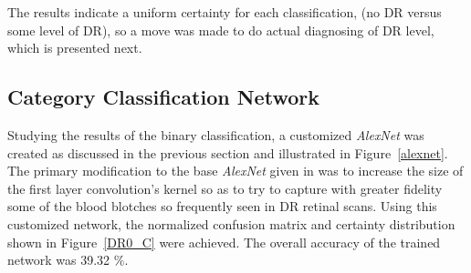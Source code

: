 \documentclass[letterpaper,12pt]{article}
\newcommand{\figref}[1]{Figure~\ref{#1}}
\begin{document}
The results indicate a uniform certainty for each classification, (no DR versus some level of DR), so a move was made to do actual diagnosing of DR level, which is presented next.

\subsection{Category Classification Network}

Studying the results of the binary classification, a customized \textit{AlexNet} was created as discussed in the previous section and illustrated in \figref{alexnet}. The primary modification to the base \textit{AlexNet} given in \cite{AlexNet} was to increase the size of the first layer convolution's kernel so as to try to capture with greater fidelity some of the blood blotches so frequently seen in DR retinal scans. Using this customized network, the normalized confusion matrix and certainty distribution shown in \figref{DR0_C} were achieved. The overall accuracy of the trained network was 39.32 $\%$.
\end{document}
